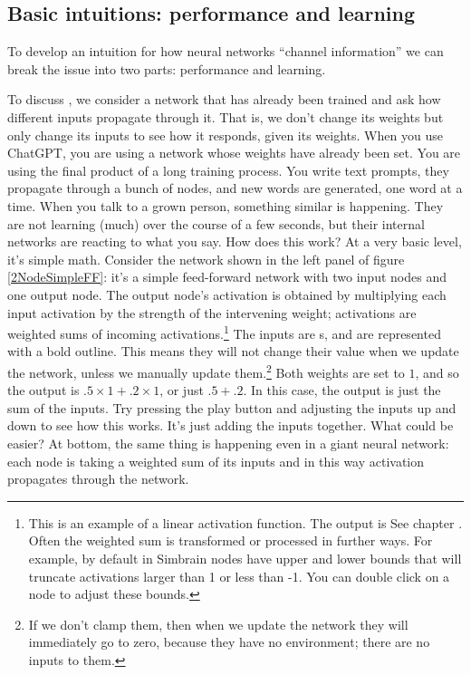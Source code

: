 \subsection{Basic intuitions: performance and learning}

To develop an intuition for how neural networks ``channel information'' we can break the issue into two parts: performance and learning. 
 
To discuss , we consider a network that has already been trained and ask how different inputs propagate through it. That is, we don't change its weights but only change its inputs to see how it responds, given its weights. When you use ChatGPT, you are using a network whose weights have already been set. You are using the final product of a long training process. You write text prompts, they propagate through a bunch of nodes, and new words are generated, one word at a time.  When you talk to a grown person, something similar is happening. They are not learning (much) over the course of a few seconds, but their internal networks are reacting to what you say.  How does this work? At a very basic level, it's simple math. Consider the network shown in the left panel of figure \ref{2NodeSimpleFF}: it's a simple feed-forward network with two input nodes and one output node. The output node's activation is obtained by multiplying each input activation by the strength of the intervening weight; activations are weighted sums of incoming activations.\footnote{This is an example of a linear activation function. The output is See chapter . Often the weighted sum is transformed or processed in further ways. For example, by default in Simbrain nodes have upper and lower bounds that will truncate  activations larger than 1 or less than -1. You can double click on a node to adjust these bounds.}  The inputs are s, and are represented with a bold outline. This means they will not change their value when we update the network, unless we manually update them.\footnote{If we don't clamp them, then when we update the network they will immediately go to zero, because they have no environment; there are no inputs to them.} Both weights are set to $1$, and so the output is  $.5 \times 1 + .2 \times 1$, or just $.5+.2$. In this case, the output is just the sum of the inputs.  Try pressing the play button and adjusting the inputs up and down to see how this works. It's just adding the inputs together. What could be easier?  At bottom, the same thing is happening even in a giant neural network: each node is taking a weighted sum of its inputs and in this way activation propagates through the network.

